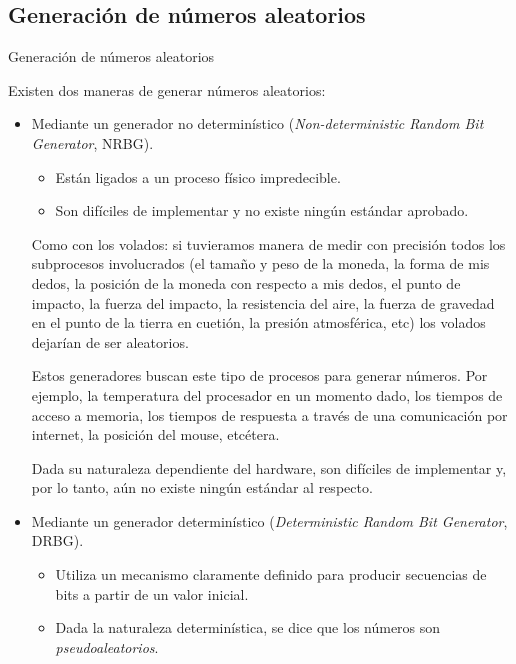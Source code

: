 %
%
%

\subsection{Generación de números aleatorios}

\begin{frame}{Generación de números aleatorios}

  Existen dos maneras de generar números aleatorios:

  \begin{itemize}

    \item<2-> Mediante un generador no determinístico (\textit{Non-deterministic
      Random Bit Generator}, NRBG).

      \begin{itemize}
        \item<3-> Están ligados a un proceso físico impredecible.
        \item<4-> Son difíciles de implementar y no existe ningún estándar
          aprobado.
      \end{itemize}

    {
      Como con los volados: si tuvieramos manera de medir con precisión todos
      los subprocesos involucrados (el tamaño y peso de la moneda, la forma de
      mis dedos, la posición de la moneda con respecto a mis dedos, el punto de
      impacto, la fuerza del impacto, la resistencia del aire, la fuerza de
      gravedad en el punto de la tierra en cuetión, la presión atmosférica, etc)
      los volados dejarían de ser aleatorios.

      Estos generadores buscan este tipo de procesos para generar números. Por
      ejemplo, la temperatura del procesador en un momento dado, los tiempos de
      acceso a memoria, los tiempos de respuesta a través de una comunicación
      por internet, la posición del mouse, etcétera.
    }

    {
      Dada su naturaleza dependiente del hardware, son difíciles de implementar
      y, por lo tanto, aún no existe ningún estándar al respecto.
    }

    \item<5-> Mediante un generador determinístico (\textit{Deterministic
      Random Bit Generator}, DRBG).

      \begin{itemize}
        \item<6-> Utiliza un mecanismo claramente definido para producir
          secuencias de bits a partir de un valor inicial.
        \item<7-> Dada la naturaleza determinística, se dice que los números son
          \textit{pseudoaleatorios}.
      \end{itemize}


\end{itemize}
\end{frame}
